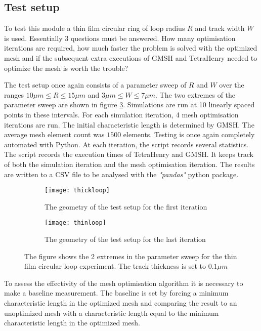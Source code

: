 \subsection{Test setup}
To test this module a thin film circular ring of loop radius $R$ and track width $W$ is used. Essentially 3 questions must be answered. How many optimisation iterations are required, how much faster the problem is solved with the optimized mesh and if the subsequent extra executions of GMSH and TetraHenry needed to optimize the mesh is worth the trouble? \par
The test setup once again consists of a parameter sweep of $R$ and $W$ over the ranges $10 \mu m \le R \le 15 \mu m $ and $  3 \mu m \le W \le7\mu m$. The two extremes of the parameter sweep are shown in figure \ref{fig:testloop}. Simulations are run at 10 linearly spaced points in these intervals. For each simulation iteration, 4 mesh optimisation iterations are run. The initial characteristic length is determined by GMSH. The average mesh element count was $1500$ elements. Testing is once again completely automated with Python. At each iteration, the script records several statistics. The script records the execution times of TetraHenry and GMSH. It keeps track of both the simulation iteration and the mesh optimisation iteration. The results are written to a CSV file to be analysed with the \textit{"pandas"} python package. 
\begin{figure}[H]
    \centering
    \begin{subfigure}[b]{0.48\textwidth}
        \centering
        \texttt{[image: thickloop]}
        \caption{The geometry of the test setup for the first iteration}
        \label{fig:thickloop}
    \end{subfigure}
    \hfill
    \begin{subfigure}[b]{0.48\textwidth}
        \centering
        \texttt{[image: thinloop]}
        \caption{The geometry of the test setup for the last iteration}
        \label{fig:thinloop}
    \end{subfigure}
    \caption{The figure shows the 2 extremes in the parameter sweep for the thin film circular loop experiment. The track thickness is set to $0.1 \mu m$}
    \label{fig:testloop}
\end{figure}
To assess the effectivity of the mesh optimisation algorithm it is necessary to make a baseline measurement. The baseline is set by forcing a minimum characteristic length in the optimized mesh and comparing the result to an unoptimized mesh with a characteristic length equal to the minimum characteristic length in the optimized mesh. \par

